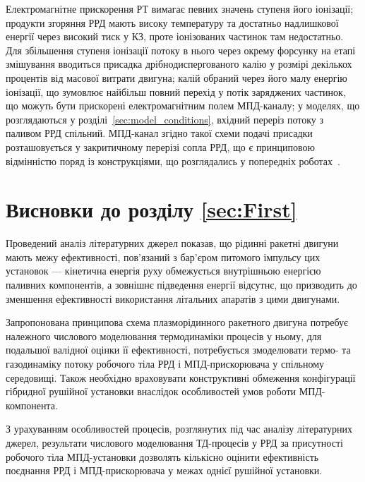 Електромагнітне прискорення РТ вимагає певних значень ступеня його іонізації; продукти згоряння РРД мають високу температуру та достатньо надлишкової енергії через високий тиск у КЗ, проте іонізованих частинок там недостатньо. Для збільшення ступеня іонізації потоку в нього через окрему форсунку на етапі змішування вводиться присадка дрібнодиспергованого калію у розмірі декількох процентів від масової витрати двигуна; калій обраний через його малу енергію іонізації, що зумовлює найбільш повний перехід у потік заряджених частинок, що можуть бути прискорені електромагнітним полем МПД-каналу; у моделях, що розглядаються у розділі~\ref{sec:model_conditions}, вхідний переріз потоку з паливом РРД спільний. МПД-канал згідно такої схеми подачі присадки розташовується у закритичному перерізі сопла РРД, що є принциповою відмінністю поряд із конструкціями, що розглядались у попередніх роботах~\cite{Previous}.


\section{Висновки до розділу \ref{sec:First}}

Проведений аналіз літературних джерел показав, що рідинні ракетні двигуни мають межу ефективності, пов'язаний з бар'єром питомого імпульсу цих установок --- кінетична енергія руху обмежується внутрішньою енергією паливних компонентів, а зовнішнє підведення енергії відсутнє, що призводить до зменшення ефективності використання літальних апаратів з цими двигунами.

Запропонована принципова схема плазморідинного ракетного двигуна потребує належного числового моделювання термодинаміки процесів у ньому, для подальшої валідної оцінки її ефективності, потребується змоделювати термо- та газодинаміку потоку робочого тіла РРД і МПД-прискорювача у спільному середовищі. Також необхідно враховувати конструктивні обмеження конфігурації гібридної рушійної установки внаслідок особливостей умов роботи МПД-компонента.

З урахуванням особливостей процесів, розглянутих під час аналізу літературних джерел, результати числового моделювання ТД-процесів у РРД за присутності робочого тіла МПД-установки дозволять кількісно оцінити ефективність поєднання РРД і МПД-прискорювача у межах однієї рушійної установки. 